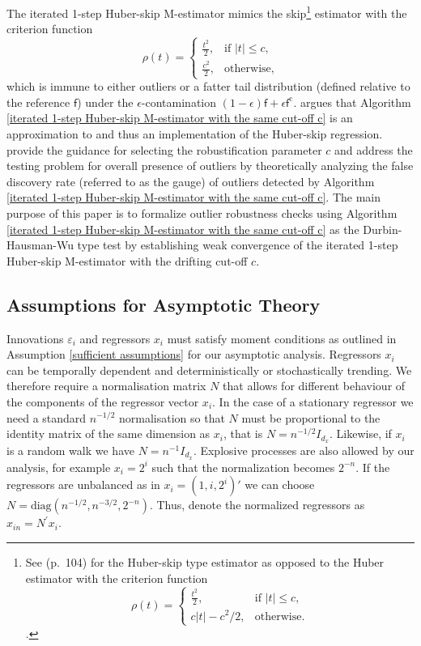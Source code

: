 \documentclass[11pt, letterpaper]{article}
\numberwithin{algorithm}{section}
\numberwithin{assumption}{section}
\numberwithin{lemma}{section}
\numberwithin{theorem}{section}
\numberwithin{corollary}{section}
\numberwithin{remark}{section}
\numberwithin{equation}{section}
\numberwithin{figure}{section}
\numberwithin{table}{section}
\begin{document}
The iterated 1-step Huber-skip M-estimator mimics the \cite{huber1964robust} skip\footnote{See \cite{hampel1986robust} (p.\ 104) for the Huber-skip type estimator as opposed to the Huber estimator with the criterion function
\begin{equation*}
\rho (t) =
\begin{cases}
\frac{t^{2}}{2}, & \mbox{if $|t| \le c$}, \\
c |t| - c^{2} / 2, & \mbox{otherwise}.
\end{cases}
\end{equation*}
.} estimator with the criterion function
\begin{equation} \label{Huber-skip criterion}
\rho (t) =
\begin{cases}
\frac{t^{2}}{2}, & \mbox{if $|t| \le c$}, \\
\frac{c^2}{2}, & \mbox{otherwise},
\end{cases}
\end{equation}
which is immune to either outliers or a fatter tail distribution (defined relative to the reference $\mathsf{f}$) under the $\epsilon$-contamination $(1 - \epsilon) \mathsf{f} + \epsilon \mathsf{f}^{\mathrm{c}}$. \cite{johansen2013outlier} argues that Algorithm \ref{iterated 1-step Huber-skip M-estimator with the same cut-off c} is an approximation to and thus an implementation of the Huber-skip regression. \cite{jiao2020testingoutlier} provide the guidance for selecting the robustification parameter $c$ and address the testing problem for overall presence of outliers by theoretically analyzing the false discovery rate (referred to as the gauge) of outliers detected by Algorithm \ref{iterated 1-step Huber-skip M-estimator with the same cut-off c}. The main purpose of this paper is to formalize outlier robustness checks using Algorithm \ref{iterated 1-step Huber-skip M-estimator with the same cut-off c} as the Durbin-Hausman-Wu type test by establishing weak convergence of the iterated 1-step Huber-skip M-estimator with the drifting cut-off $c$.


\subsection{Assumptions for Asymptotic Theory} \label{sec_assumptions}
Innovations $\varepsilon_{i}$ and regressors $x_{i}$ must satisfy moment conditions as outlined in Assumption \ref{sufficient assumptions} for our asymptotic analysis. Regressors $x_{i}$ can be temporally dependent and deterministically or stochastically trending. We therefore require a normalisation matrix $N$ that allows for different behaviour of the components of the regressor vector $x_i$. In the case of a stationary regressor we need a standard $n^{-1/2}$ normalisation so that $N$ must be proportional to the identity matrix of the same dimension as $x_i$, that is $N = n^{-1/2}I_{d_{x}}$. Likewise, if $x_i$ is a random walk we have $N = n^{-1}I_{d_{x}}$. Explosive processes are also allowed by our analysis, for example $x_{i} = 2^{i}$ such that the normalization becomes $2^{-n}$. If the regressors are unbalanced as in $x_i=(1, i, 2^{i})'$ we can choose $N=\mathrm{diag} (n^{-1/2}, n^{-3/2}, 2^{-n})$. Thus, denote the normalized regressors as $x_{in} = N^{\prime} x_{i}$.
\end{document}
